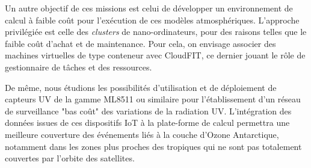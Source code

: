 Un autre objectif de ces missions est celui de développer un environnement de calcul à faible coût pour l'exécution de ces modèles atmosphériques. L'approche privilégiée est celle des \textit{clusters} de nano-ordinateurs, pour des raisons telles que le faible coût d'achat et de maintenance. Pour cela, on envisage associer des machines virtuelles de type conteneur avec CloudFIT, ce dernier jouant le rôle de gestionnaire de tâches et des ressources.   

De même, nous étudions les possibilités d'utilisation et de déploiement de capteurs UV de la gamme ML8511 ou similaire pour l'établissement d'un réseau de surveillance "bas coût" des variations de la radiation UV. L'intégration des données issues de ces dispositifs IoT à la plate-forme de calcul permettra une meilleure couverture des événements liés à la couche d'Ozone Antarctique, notamment dans les zones plus proches des tropiques qui ne sont pas totalement couvertes par l'orbite des satellites.
